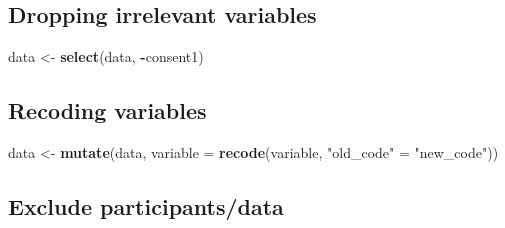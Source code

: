 \documentclass[]{book}
\newenvironment{Shaded}{\begin{snugshade}}{\end{snugshade}}
\newcommand{\CommentTok}[1]{\textcolor[rgb]{0.56,0.35,0.01}{\textit{#1}}}
\newcommand{\DataTypeTok}[1]{\textcolor[rgb]{0.13,0.29,0.53}{#1}}
\newcommand{\DecValTok}[1]{\textcolor[rgb]{0.00,0.00,0.81}{#1}}
\newcommand{\KeywordTok}[1]{\textcolor[rgb]{0.13,0.29,0.53}{\textbf{#1}}}
\newcommand{\NormalTok}[1]{#1}
\newcommand{\OperatorTok}[1]{\textcolor[rgb]{0.81,0.36,0.00}{\textbf{#1}}}
\newcommand{\StringTok}[1]{\textcolor[rgb]{0.31,0.60,0.02}{#1}}
\begin{document}
\hypertarget{dropping-irrelevant-variables}{%
\subsection{Dropping irrelevant variables}\label{dropping-irrelevant-variables}}

\begin{Shaded}
\begin{Highlighting}[]
\NormalTok{data <-}\StringTok{ }\KeywordTok{select}\NormalTok{(data, }\OperatorTok{-}\NormalTok{consent1)}
\end{Highlighting}
\end{Shaded}

\hypertarget{recoding-variables}{%
\subsection{Recoding variables}\label{recoding-variables}}

\begin{Shaded}
\begin{Highlighting}[]
\NormalTok{data <-}\StringTok{ }\KeywordTok{mutate}\NormalTok{(data, }\DataTypeTok{variable =} \KeywordTok{recode}\NormalTok{(variable, }\StringTok{"old_code"}\NormalTok{ =}\StringTok{ "new_code"}\NormalTok{))}
\end{Highlighting}
\end{Shaded}

\hypertarget{exclude-participantsdata}{%
\subsection{Exclude participants/data}\label{exclude-participantsdata}}

\begin{Shaded}
\end{Shaded}
\end{document}
